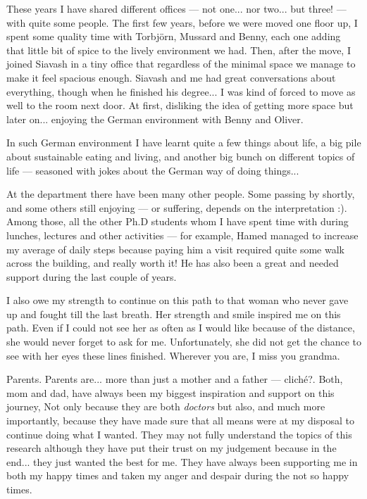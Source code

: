 These years I have shared different offices --- not one... nor two... but three! 
--- with quite some people. The first few years, before we were moved one floor 
up, I spent some quality time with Torbj\"{o}rn, Mussard and Benny, each one adding 
that little bit of spice to the lively environment we had. Then, after the move, 
I joined Siavash in a tiny office that regardless of the minimal space we manage 
to make it feel spacious enough. Siavash and me had great conversations about everything, 
though when he finished his degree... I was kind of forced to move as well to the 
room next door. At first, disliking the idea of getting more space but later on... 
enjoying the German environment with Benny and Oliver.

In such German environment I have learnt quite a few things about life, a big pile 
about sustainable eating and living, and another big bunch on different topics of 
life --- seasoned with jokes about the German way of doing things...

At the department there have been many other people. Some passing by shortly, and 
some others still enjoying --- or suffering, depends on the interpretation :). Among 
those, all the other Ph.D students whom I have spent time with during lunches, lectures 
and other activities --- for example, Hamed managed to increase my average of daily 
steps because paying him a visit required quite some walk across the building, and 
really worth it! He has also been a great and needed support during the last couple 
of years.

I also owe my strength to continue on this path to that woman who never gave up 
and fought till the last breath. Her strength and smile inspired me on this path.
Even if I could not see her as often as I would like because of the distance, she 
would never forget to ask for me. Unfortunately, she did not get the chance to see 
with her eyes these lines finished. Wherever you are, I miss you grandma.

Parents. Parents are... more than just a mother and a father --- cliché?. Both, 
mom and dad, have always been my biggest inspiration and support on this journey, 
Not only because they are both \emph{doctors} but also, and much more importantly, 
because they have made sure that all means were at my disposal to continue doing 
what I wanted. They may not fully understand the topics of this research although 
they have put their trust on my judgement because in the end... they just wanted 
the best for me. They have always been supporting me in both my happy times and 
taken my anger and despair during the not so happy times.

